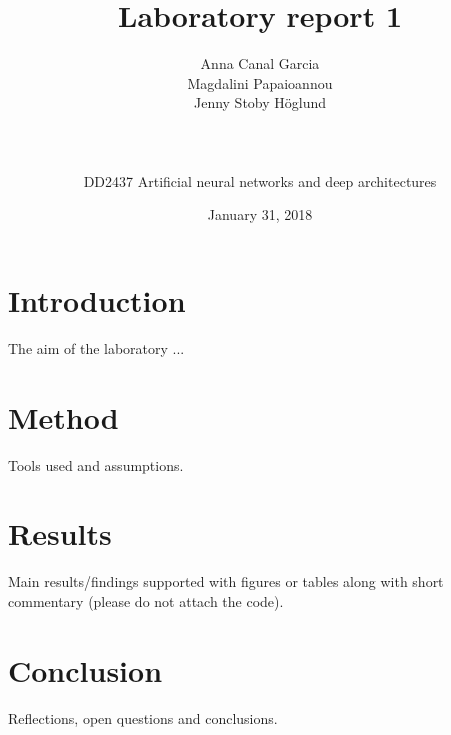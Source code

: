 \documentclass[a4paper,10pt]{article}
\begin{document}
    
    \title{Laboratory report 1}
    
    
    \author{
        Anna Canal Garcia\\
        Magdalini Papaioannou\\
        Jenny Stoby H\"{o}glund\\
        \\
        \\
        \\
        DD2437 Artificial neural networks and deep architectures
    }
    \date{January 31, 2018}
    \maketitle
    
    \newpage
    
    
    \section{Introduction}
    The aim of the laboratory ... 

    \section{Method}
    Tools used and assumptions. 

    \section{Results}
    Main results/findings supported with figures or tables along with short commentary (please do not attach the code).

    \section{Conclusion}
    Reflections, open questions and conclusions.

    
\end{document}
